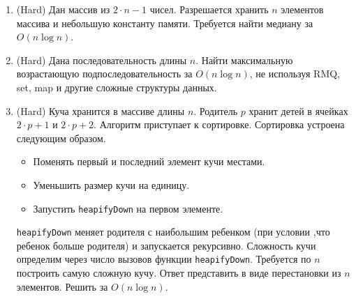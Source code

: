 \begin{enumerate}
  \item (Hard)  Дан массив из $2 \cdot n - 1$ чисел. Разрешается хранить 
	$n$ элементов массива и небольшую константу памяти. Требуется найти 
	медиану за $O(n \log n)$.

  \item (Hard) Дана последовательность длины $n$. Найти максимальную возрастающую 
	подпоследовательность за $O(n \log n)$, не используя RMQ, set, map и 
	другие сложные структуры данных.

  \item (Hard) Куча хранится в массиве длины $n$. Родитель $p$ хранит детей
	в ячейках $2 \cdot p + 1$ и $2 \cdot p + 2$. Алгоритм приступает
	к сортировке. Сортировка устроена следующим образом. 
	\begin{itemize}
	  \item Поменять первый и последний элемент кучи местами.
	  \item Уменьшить размер кучи на единицу.
	  \item Запустить \texttt{heapifyDown} на первом элементе.
	\end{itemize}
	\texttt{heapifyDown} меняет родителя с наибольшим ребенком (при условии
    ,что ребенок больше родителя) и запускается рекурсивно.
	Сложность кучи определим через число вызовов функции \texttt{heapifyDown}.
	Требуется по $n$ построить самую сложную кучу. Ответ представить в виде
	перестановки из $n$ элементов. Решить за $O(n \log n)$.

\end{enumerate}
